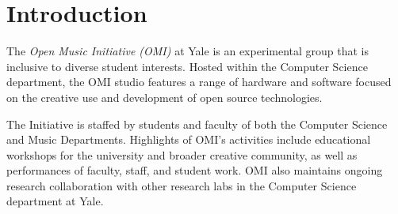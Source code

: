 \section{Introduction}

The \textit{Open Music Initiative (OMI)} at Yale is an experimental group that is inclusive to diverse student interests. Hosted within the Computer Science department, the OMI studio features a range of hardware and software focused on the creative use and development of open source technologies.

The Initiative is staffed by students and faculty of both the Computer Science and Music Departments. Highlights of OMI's activities include educational workshops for the university and broader creative community, as well as performances of faculty, staff, and student work. OMI also maintains ongoing research collaboration with other research labs in the Computer Science department at Yale.

